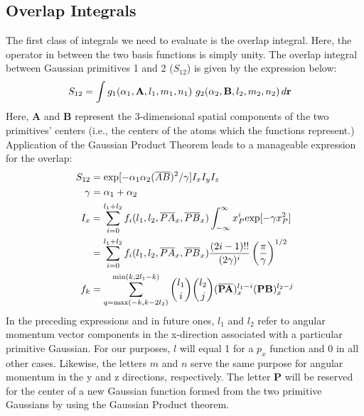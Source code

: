 \documentclass[12pt]{article}
\begin{document}
\subsection{Overlap Integrals}
The first class of integrals we need to evaluate is the overlap integral. Here, the operator
in between the two basis functions is simply unity. The overlap integral between
Gaussian primitives 1 and 2 ($S_{12}$) is given by the expression below:
\begin{align*}
S_{12} &= \int g_1(\alpha_1,{\bf A},l_1,m_1,n_1) \ g_2(\alpha_2,{\bf B},l_2,m_2,n_2)\,d{\bf r}
\end{align*}
Here, {\bf A} and {\bf B} represent the 3-dimensional spatial components of the two
primitives' centers (i.e., the centers of the atoms which the functions represent.)
Application of the Gaussian Product Theorem leads to a manageable expression for
the overlap:
\begin{align*}
S_{12}&=\mathrm{exp}[-\alpha_1\alpha_2(\overline{AB})^2/\gamma]I_xI_yI_z \\
\gamma &= \alpha_1+\alpha_2 \\
I_x &=\displaystyle\sum\limits_{i=0}^{l_1+l_2}f_i(l_1,l_2,\overline{PA}_x,\overline{PB}_x)
\int^\infty_{-\infty} x_P^i \mathrm{exp}[-\gamma x_P^2] \\
&= \displaystyle\sum\limits_{i=0}^{l_1+l_2}f_i(l_1,l_2,\overline{PA}_x,\overline{PB}_x)
\frac{ (2i-1)!! } { (2\gamma)^i} \left( \frac{\pi}{\gamma}\right) ^{1/2} \\
f_k &= \displaystyle\sum\limits_{q=\mathrm{max}(-k,k-2l_2)}^{\mathrm{min}(k,2l_1-k)}
{l_1 \choose i} {l_2 \choose j} (\overline {\bf PA})_x^{l_1-i} ({\bf PB})_x^{l_2-j}
\end{align*}
In the preceding expressions and in future ones, $l_1$ and $l_2$ refer to angular momentum
vector components in the x-direction associated with a particular primitive Gaussian. For
our purposes, $l$ will equal 1 for a $p_x$ function and 0 in all other cases. Likewise, the letters
$m$ and $n$ serve the same purpose for angular momentum in the y and z directions,
respectively. The letter {\bf P} will be reserved for the center of a new Gaussian function
formed from the two primitive Gaussians by using the Gaussian Product theorem.
\end{document}
